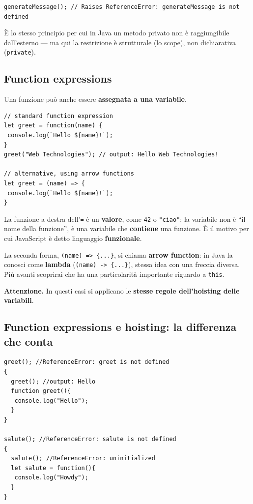 \documentclass[10pt,a4paper]{article}
\newcommand{\avviso}[1]{\textbf{\textcolor{wamber}{Attenzione.}} #1}
\begin{document}
\begin{lstlisting}[style=js]
generateMessage(); // Raises ReferenceError: generateMessage is not defined
\end{lstlisting}

È lo stesso principio per cui in Java un metodo privato non è raggiungibile dall'esterno --- ma qui la restrizione è strutturale (lo scope), non dichiarativa (\texttt{private}).

\subsection{Function expressions}

Una funzione può anche essere \textbf{assegnata a una variabile}.

\begin{lstlisting}[style=js]
// standard function expression
let greet = function(name) {
 console.log(`Hello ${name}!`);
}
greet("Web Technologies"); // output: Hello Web Technologies!

// alternative, using arrow functions
let greet = (name) => {
 console.log(`Hello ${name}!`);
}
\end{lstlisting}

La funzione a destra dell'\texttt{=} è un \textbf{valore}, come \texttt{42} o \texttt{"ciao"}: la variabile non è ``il nome della funzione'', è una variabile che \textbf{contiene} una funzione. È il motivo per cui JavaScript è detto linguaggio \textbf{funzionale}.

La seconda forma, \texttt{(name) => \{...\}}, si chiama \textbf{arrow function}: in Java la conosci come \textbf{lambda} (\texttt{(name) -> \{...\}}), stessa idea con una freccia diversa. Più avanti scoprirai che ha una particolarità importante riguardo a \texttt{this}.

\begin{warnbox}
\avviso{In questi casi si applicano le \textbf{stesse regole dell'hoisting delle variabili}.}
\end{warnbox}

\subsection{Function expressions e hoisting: la differenza che conta}

\begin{lstlisting}[style=js]
greet(); //ReferenceError: greet is not defined
{
  greet(); //output: Hello
  function greet(){
   console.log("Hello");
  }
}

salute(); //ReferenceError: salute is not defined
{
  salute(); //ReferenceError: uninitialized
  let salute = function(){
   console.log("Howdy");
  }
}
\end{lstlisting}
\end{document}
